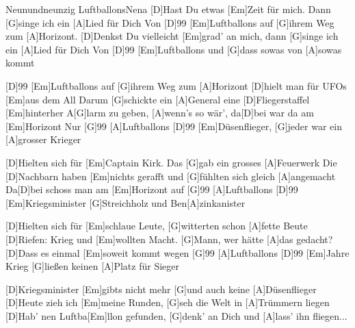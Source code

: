 \documentclass[../main.tex]{subfiles}
\begin{document}
\begin{song}{Neunundneunzig Luftballons}{Nena}{}
[D]Hast Du etwas [Em]Zeit für mich. Dann [G]singe ich ein [A]Lied für Dich
Von [D]99 [Em]Luftballons auf [G]ihrem Weg zum [A]Horizont.
[D]Denkst Du vielleicht [Em]grad' an mich, dann [G]singe ich ein [A]Lied für Dich
Von [D]99 [Em]Luftballons und [G]dass sowas von [A]sowas kommt

[D]99 [Em]Luftballons auf [G]ihrem Weg zum [A]Horizont [D]hielt man für UFOs [Em]aus dem All
Darum [G]schickte ein [A]General eine [D]Fliegerstaffel [Em]hinterher
A[G]larm zu geben, [A]wenn's so wär', da[D]bei war da am [Em]Horizont Nur [G]99 [A]Luftballons
[D]99 [Em]Düsenflieger, [G]jeder war ein [A]grosser Krieger

[D]Hielten sich für [Em]Captain Kirk. Das [G]gab ein grosses [A]Feuerwerk
Die [D]Nachbarn haben [Em]nichts gerafft und [G]fühlten sich gleich [A]angemacht
Da[D]bei schoss man am [Em]Horizont auf [G]99 [A]Luftballons
[D]99 [Em]Kriegsminister [G]Streichholz und Ben[A]zinkanister

[D]Hielten sich für [Em]schlaue Leute, [G]witterten schon [A]fette Beute
[D]Riefen: Krieg und [Em]wollten Macht. [G]Mann, wer hätte [A]das gedacht?
[D]Dass es einmal [Em]soweit kommt wegen [G]99 [A]Luftballons
[D]99 [Em]Jahre Krieg [G]ließen keinen [A]Platz für Sieger

[D]Kriegsminister [Em]gibts nicht mehr [G]und auch keine [A]Düsenflieger
[D]Heute zieh ich [Em]meine Runden, [G]seh die Welt in [A]Trümmern liegen
[D]Hab' nen Luftba[Em]llon gefunden, [G]denk' an Dich und [A]lass' ihn fliegen...
\end{song}
\end{document}
